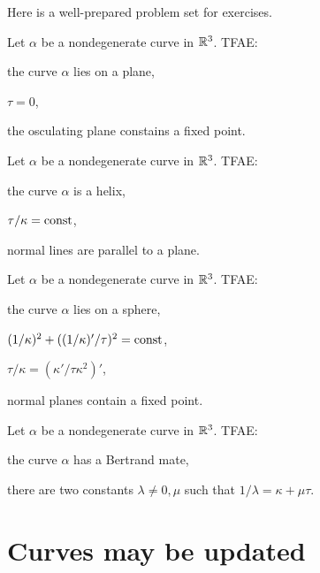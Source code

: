 \documentclass{../../large}
\def\a{\alpha}
\begin{document}
Here is a well-prepared problem set for exercises.

\begin{prb}
Let $\a$ be a nondegenerate curve in $\mathbb{R}^3$.
TFAE:
\begin{parts}
\item the curve $\a$ lies on a plane,
\item $\tau=0$,
\item the osculating plane constains a fixed point.
\end{parts}
\end{prb}

\begin{prb}[Helices]
Let $\a$ be a nondegenerate curve in $\mathbb{R}^3$.
TFAE:
\begin{parts}
\item the curve $\a$ is a helix,
\item $\tau/\kappa=\operatorname{const}$,
\item normal lines are parallel to a plane.
\end{parts}
\end{prb}

\begin{prb}
Let $\a$ be a nondegenerate curve in $\mathbb{R}^3$.
TFAE:
\begin{parts}
\item the curve $\a$ lies on a sphere,
\item $(1/\kappa)^2+((1/\kappa)'/\tau)^2=\operatorname{const}$,
\item $\tau/\kappa=(\kappa'/\tau\kappa^2)'$,
\item normal planes contain a fixed point.
\end{parts}
\end{prb}

\begin{prb}
Let $\a$ be a nondegenerate curve in $\mathbb{R}^3$.
TFAE:
\begin{parts}
\item the curve $\a$ has a Bertrand mate,
\item there are two constants $\lambda\ne0,\mu$ such that $1/\lambda=\kappa+\mu\tau$.
\end{parts}
\end{prb}











\section{Curves may be updated}
\end{document}
